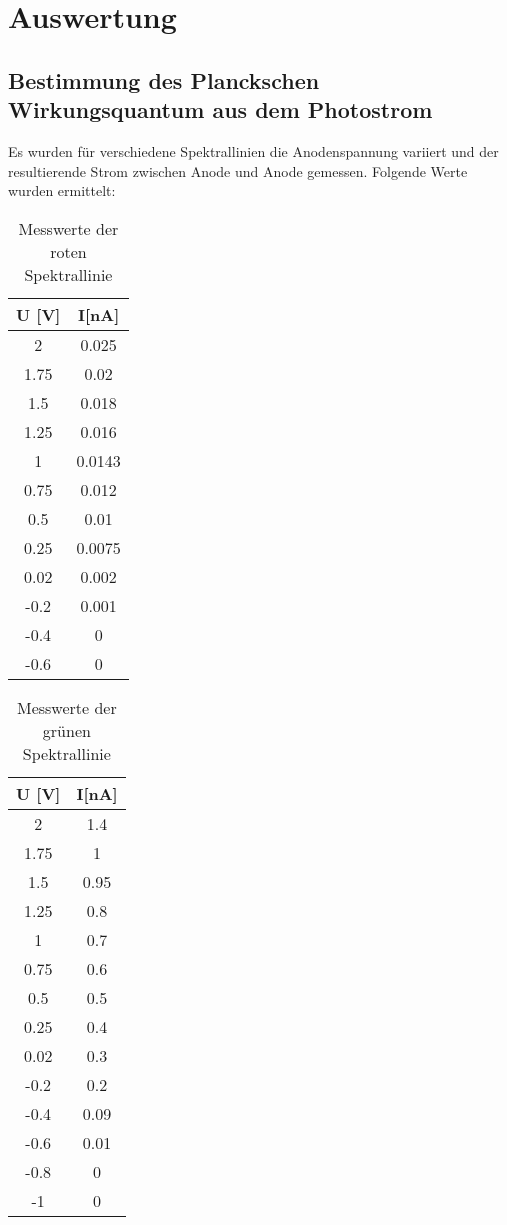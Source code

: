 \section{Auswertung}
\label{sec:Auswertung}

\subsection{Bestimmung des Planckschen Wirkungsquantum aus dem Photostrom}
  Es wurden für verschiedene Spektrallinien die Anodenspannung variiert und der resultierende
  Strom zwischen Anode und Anode gemessen. Folgende Werte wurden ermittelt:
  \begin{table}[H]
    \centering
    \caption{Messwerte der roten Spektrallinie}
    \label{tab:fiesemoepp}
    \begin{tabular}{c c}
     \toprule
      U [V]& I[nA]\\
     \midrule
      2    & 0.025  \\
      1.75 & 0.02   \\
      1.5  & 0.018  \\
      1.25 & 0.016  \\
      1    & 0.0143 \\
      0.75 & 0.012  \\
      0.5  & 0.01   \\
      0.25 & 0.0075 \\
      0.02 & 0.002  \\
     -0.2  & 0.001  \\
     -0.4  & 0      \\
     -0.6  & 0      \\
     \bottomrule
    \end{tabular}
  \end{table}
  \begin{table}[H]
    \centering
    \caption{Messwerte der grünen Spektrallinie}
    \begin{tabular}{c c}
     \toprule
      U [V]& I[nA]\\
     \midrule
     2    & 1.4  \\
     1.75 & 1    \\
     1.5  & 0.95 \\
     1.25 & 0.8  \\
     1    & 0.7  \\
     0.75 & 0.6  \\
     0.5  & 0.5  \\
     0.25 & 0.4  \\
     0.02 & 0.3  \\
    -0.2  & 0.2  \\
    -0.4  & 0.09 \\
    -0.6  & 0.01 \\
    -0.8  & 0    \\
     -1    & 0    \\
     \bottomrule
    \end{tabular}
  \end{table}  
